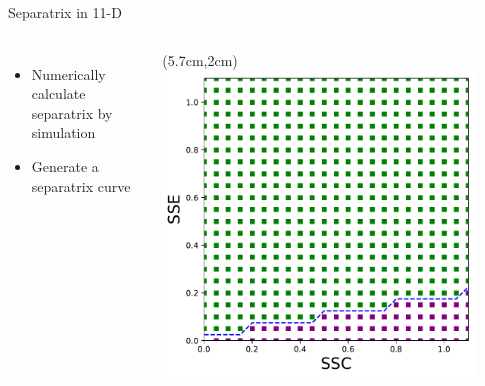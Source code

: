 \documentclass[15pt]{beamer}
\begin{document}
\begin{frame}{Separatrix in 11-D}
\begin{columns}
\begin{itemize}
	\item Numerically calculate separatrix by simulation
	\item Generate a separatrix curve 
\end{itemize}
	
	\begin{textblock*}{7.6cm}(5.7cm,2cm) %
	 \includegraphics[width=0.9\textwidth]{gLV_phases_N_23_plot}
	\end{textblock*}
\end{columns}
\end{frame}
\end{document}
